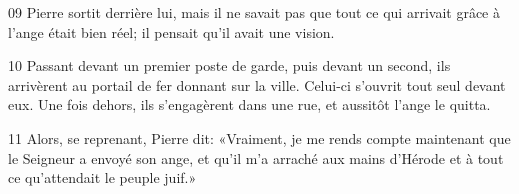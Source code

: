
09 Pierre sortit derrière lui, mais il ne savait pas que tout ce qui arrivait grâce à l’ange était bien réel; il pensait qu’il avait une vision.

10 Passant devant un premier poste de garde, puis devant un second, ils arrivèrent au portail de fer donnant sur la ville. Celui-ci s’ouvrit tout seul devant eux. Une fois dehors, ils s’engagèrent dans une rue, et aussitôt l’ange le quitta.

11 Alors, se reprenant, Pierre dit: «Vraiment, je me rends compte maintenant que le Seigneur a envoyé son ange, et qu’il m’a arraché aux mains d’Hérode et à tout ce qu’attendait le peuple juif.»
